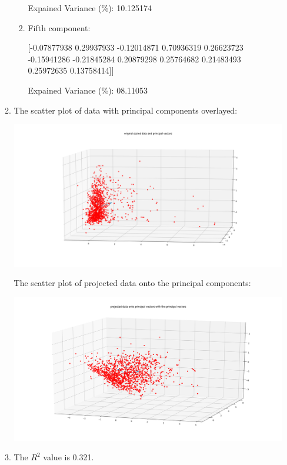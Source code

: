 \documentclass[twoside,10pt]{article}
\theoremstyle{definition}
\theoremstyle{definition}
\theoremstyle{remark}
\renewcommand{\>}{{\rightarrow}}
\newcommand{\1}{{\mathbf 1}}
\newcommand{\0}{{\mathbf 0}}
\begin{document}
\begin{enumerate}
\begin{enumerate}
\begin{enumerate}
  Expained Variance (\%):
  10.125174

   \item
     Fifth component:
     
      [-0.07877938  0.29937933 -0.12014871  0.70936319  0.26623723 -0.15941286
      -0.21845284  0.20879298  0.25764682  0.21483493  0.25972635  0.13758414]]

      Expained Variance (\%):
      08.11053
      
    \end{enumerate}
    
  \item

    The scatter plot of data with principal components overlayed:

    \includegraphics[width=\textwidth]{data_and_pcVectors.png}

    The scatter plot of projected data onto the principal components:

    \includegraphics[width=\textwidth]{projected_data_onto_pcVectors.png}
    

  \item

    The $R^2$ value is 0.321.


\end{enumerate}
\end{enumerate}
\end{document}
